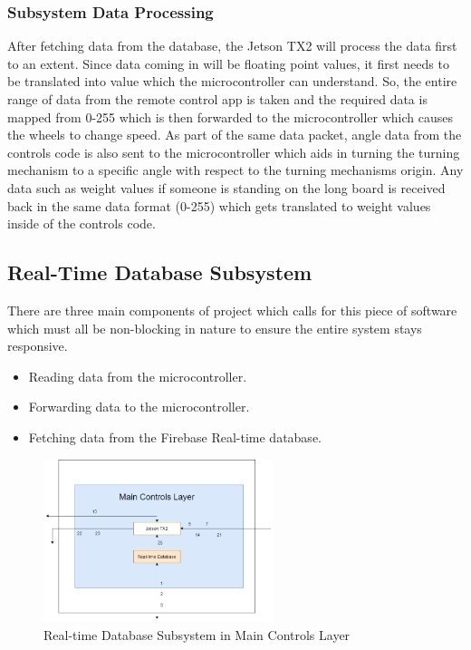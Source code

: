 \subsubsection{Subsystem Data Processing}
After fetching data from the database, the Jetson TX2 will process the data first to an extent. Since data coming in will be floating point values, it first needs to be translated into value which the microcontroller can understand. So, the entire range of data from the remote control app is taken and the required data is mapped from 0-255 which is then forwarded to the microcontroller which causes the wheels to change speed. As part of the same data packet, angle data from the controls code is also sent to the microcontroller which aids in turning the turning mechanism to a specific angle with respect to the turning mechanisms origin. Any data such as weight values if someone is standing on the long board is received back in the same data format (0-255) which gets translated to weight values inside of the controls code.

\subsection{Real-Time Database Subsystem}
There are three main components of project which calls for this piece of software which must all be non-blocking in nature to ensure the entire system stays responsive.
\begin{itemize}
    \item Reading data from the microcontroller.
    \item Forwarding data to the microcontroller.
    \item Fetching data from the Firebase Real-time database.
\end{itemize}

\begin{figure}[h!]
	\centering
 	\includegraphics[width=0.60\textwidth]{images/RTD.png}
 \caption{Real-time Database Subsystem in Main Controls Layer}
\end{figure}

